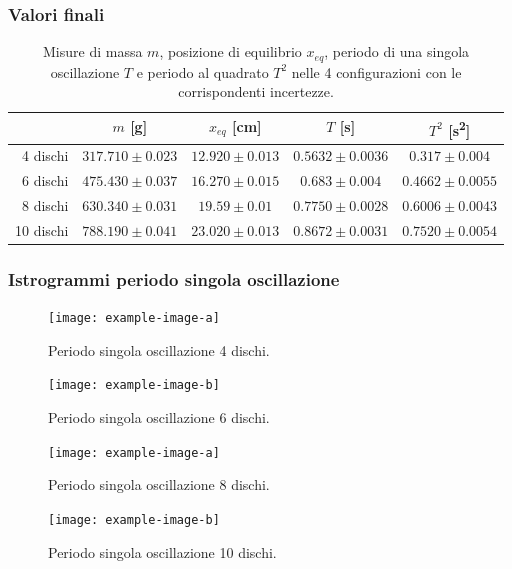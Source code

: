 \documentclass[titlepage]{article}
\numberwithin{equation}{section}
\numberwithin{figure}{section}
\numberwithin{table}{section}
\begin{document}
\subsubsection{Valori finali}

\begin{table}[ht]
  \centering
  \begin{tabular}{rcccc}
    \toprule
    & $m$ [\si{\gram}] & $x_{eq}$ [\si{\centi\metre}] & $T$ [\si{\second}] & $T^2$ [\si{\second\squared}] \\
    \midrule
    4 dischi  & $317.710 \pm 0.023$ & $12.920 \pm 0.013$ & $0.5632 \pm 0.0036$ & $0.317  \pm  0.004$ \\
    6 dischi  & $475.430 \pm 0.037$ & $16.270 \pm 0.015$ & $0.683  \pm  0.004$ & $0.4662 \pm 0.0055$ \\
    8 dischi  & $630.340 \pm 0.031$ & $19.59  \pm  0.01$ & $0.7750 \pm 0.0028$ & $0.6006 \pm 0.0043$ \\
    10 dischi & $788.190 \pm 0.041$ & $23.020 \pm 0.013$ & $0.8672 \pm 0.0031$ & $0.7520 \pm 0.0054$ \\
    \bottomrule
  \end{tabular}
  \caption{Misure di massa $m$, posizione di equilibrio $x_{eq}$, periodo di una singola oscillazione $T$ e periodo al quadrato $T^2$ nelle 4 configurazioni con le corrispondenti incertezze.}
\end{table}

\pagebreak
\subsubsection{Istrogrammi periodo singola oscillazione}

\begin{figure}[ht]
  \centering
  \begin{minipage}{0.5 \textwidth}
    \texttt{[image: example-image-a]}
    \caption{Periodo singola oscillazione 4 dischi.}
  \end{minipage}%
  \begin{minipage}{0.5 \textwidth}
    \texttt{[image: example-image-b]}
    \caption{Periodo singola oscillazione 6 dischi.}
  \end{minipage}
\end{figure}

\begin{figure}[ht]
  \centering
  \begin{minipage}{0.5 \textwidth}
    \texttt{[image: example-image-a]}
    \caption{Periodo singola oscillazione 8 dischi.}
  \end{minipage}%
  \begin{minipage}{0.5 \textwidth}
    \texttt{[image: example-image-b]}
    \caption{Periodo singola oscillazione 10 dischi.}
  \end{minipage}
\end{figure}
\end{document}
